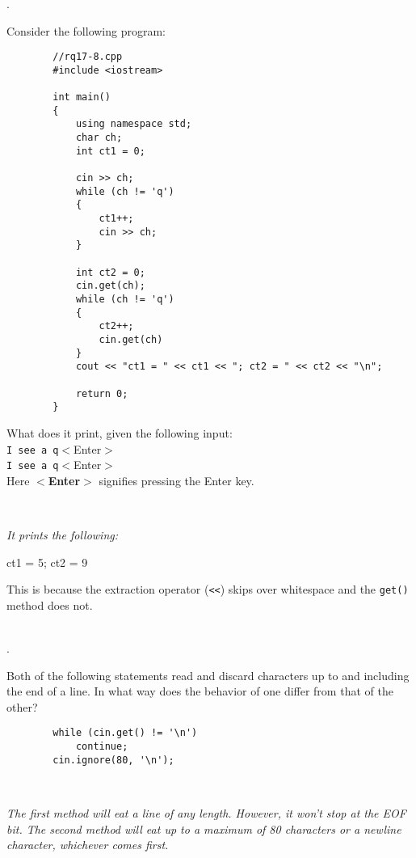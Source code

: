\documentclass{amsart}
\newcommand{\ttt}[1]{\texttt{#1}}
\begin{document}
. 
\begin{minipage}[t]{11.5 cm}
	Consider the following program:
	\begin{verbatim}
		//rq17-8.cpp
		#include <iostream>
		
		int main()
		{
		    using namespace std;
		    char ch;
		    int ct1 = 0;
		
		    cin >> ch;
		    while (ch != 'q')
		    {
		        ct1++;
		        cin >> ch;
		    }
		
		    int ct2 = 0;
		    cin.get(ch);
		    while (ch != 'q')
		    {
		        ct2++;
		        cin.get(ch)
		    }
		    cout << "ct1 = " << ct1 << "; ct2 = " << ct2 << "\n";
		
		    return 0;
		}
	\end{verbatim}
	What does it print, given the following input: \\[1ex]
	\verb+I see a q+{\small $<$Enter$>$} \\	
	\verb+I see a q+{\small $<$Enter$>$} \\[1ex]
	Here \textbf{$<$Enter$>$} signifies pressing the Enter key.
\end{minipage} \\[1ex]
\phantom{3. } 
\begin{minipage}[t]{11.5 cm}
	{\slshape 
		It prints the following:
	} 

	{\ttfamily
		ct1 = 5; ct2 = 9
	}

	This is because the extraction operator (\ttt{<<}) skips over 
	whitespace and the \ttt{get()} method does not.
\end{minipage} 
\\[2ex]

. 
\begin{minipage}[t]{11.5 cm}
	Both of the following statements read and discard characters up to and including the end of a line. In what way does the behavior of one differ from that of the other?
	\begin{verbatim}
		while (cin.get() != '\n')
		    continue;
		cin.ignore(80, '\n');
	\end{verbatim}
\end{minipage} \\[1ex]
\phantom{2. } 
\begin{minipage}[t]{11.5 cm}
	{\slshape 
		The first method will eat a line of any length.
		However, it won't stop at the EOF bit.
		The second method will eat up to a maximum of 80 characters
		or a newline character, whichever comes first.
	} 
\end{minipage} 
\end{document}
